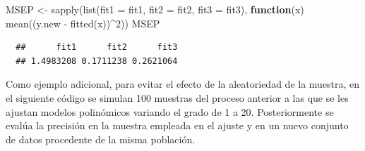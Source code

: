 \documentclass[
]{book}
\newenvironment{Shaded}{\begin{snugshade}}{\end{snugshade}}
\newcommand{\AttributeTok}[1]{\textcolor[rgb]{0.77,0.63,0.00}{#1}}
\newcommand{\ControlFlowTok}[1]{\textcolor[rgb]{0.13,0.29,0.53}{\textbf{#1}}}
\newcommand{\DecValTok}[1]{\textcolor[rgb]{0.00,0.00,0.81}{#1}}
\newcommand{\FunctionTok}[1]{\textcolor[rgb]{0.00,0.00,0.00}{#1}}
\newcommand{\NormalTok}[1]{#1}
\newcommand{\OtherTok}[1]{\textcolor[rgb]{0.56,0.35,0.01}{#1}}
\newcommand{\SpecialCharTok}[1]{\textcolor[rgb]{0.00,0.00,0.00}{#1}}
\theoremstyle{break}
\theoremstyle{nonumberplain}
\begin{document}
\begin{Shaded}
\begin{Highlighting}[]
\NormalTok{MSEP }\OtherTok{\textless{}{-}} \FunctionTok{sapply}\NormalTok{(}\FunctionTok{list}\NormalTok{(}\AttributeTok{fit1 =}\NormalTok{ fit1, }\AttributeTok{fit2 =}\NormalTok{ fit2, }\AttributeTok{fit3 =}\NormalTok{ fit3), }
               \ControlFlowTok{function}\NormalTok{(x) }\FunctionTok{mean}\NormalTok{((y.new }\SpecialCharTok{{-}} \FunctionTok{fitted}\NormalTok{(x))}\SpecialCharTok{\^{}}\DecValTok{2}\NormalTok{))}
\NormalTok{MSEP}
\end{Highlighting}
\end{Shaded}

\begin{verbatim}
  ##      fit1      fit2      fit3 
  ## 1.4983208 0.1711238 0.2621064
\end{verbatim}

Como ejemplo adicional, para evitar el efecto de la aleatoriedad de la muestra, en el siguiente código se simulan 100 muestras del proceso anterior a las que se les ajustan modelos polinómicos variando el grado de 1 a 20.
Posteriormente se evalúa la precisión en la muestra empleada en el ajuste y en un nuevo conjunto de datos procedente de la misma población.
\end{document}
